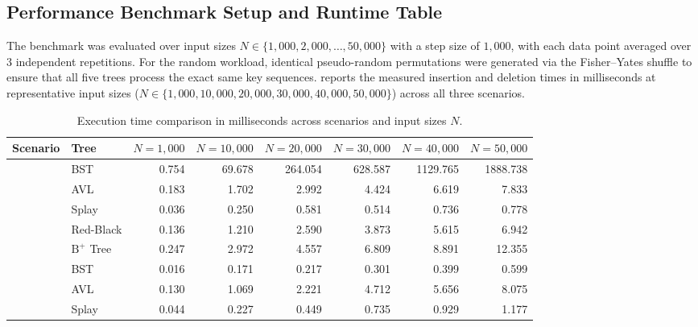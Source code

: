 \documentclass[10pt, a4paper]{article}
\begin{document}
\subsection{Performance Benchmark Setup and Runtime Table}
The benchmark was evaluated over input sizes $N \in \{1{,}000, 2{,}000, \dots, 50{,}000\}$ with a step size of $1{,}000$, with each data point averaged over $3$ independent repetitions. For the random workload, identical pseudo-random permutations were generated via the Fisher--Yates shuffle to ensure that all five trees process the exact same key sequences.  reports the measured insertion and deletion times in milliseconds at representative input sizes ($N \in \{1{,}000, 10{,}000, 20{,}000, 30{,}000, 40{,}000, 50{,}000\}$) across all three scenarios.
\vspace{-0.4em}
\begin{table}[H]
\centering
\caption{Execution time comparison in milliseconds across scenarios and input sizes $N$.}
\label{tab:runtime_table}
\renewcommand{\arraystretch}{0.95}
\setlength{\tabcolsep}{4.2pt}
\begin{tabular}{@{}llrrrrrr@{}}
\toprule
\textbf{\color{primary}Scenario} & \textbf{\color{primary}Tree} & \textbf{\color{primary}$N=1{,}000$} & \textbf{\color{primary}$N=10{,}000$} & \textbf{\color{primary}$N=20{,}000$} & \textbf{\color{primary}$N=30{,}000$} & \textbf{\color{primary}$N=40{,}000$} & \textbf{\color{primary}$N=50{,}000$} \\
\midrule
{}
  & BST       & 0.754 & 69.678 & 264.054 & 628.587 & 1129.765 & 1888.738 \\
  & AVL       & 0.183 &  1.702 &   2.992 &   4.424 &    6.619 &    7.833 \\
  & Splay     & 0.036 &  0.250 &   0.581 &   0.514 &    0.736 &    0.778 \\
  & Red-Black & 0.136 &  1.210 &   2.590 &   3.873 &    5.615 &    6.942 \\
  & $\text{B}^+$ Tree & 0.247 &  2.972 &   4.557 &   6.809 &    8.891 &   12.355 \\
\midrule
{}
  & BST       & 0.016 &  0.171 &   0.217 &   0.301 &    0.399 &    0.599 \\
  & AVL       & 0.130 &  1.069 &   2.221 &   4.712 &    5.656 &    8.075 \\
  & Splay     & 0.044 &  0.227 &   0.449 &   0.735 &    0.929 &    1.177 \\

\end{tabular}
\end{table}
\end{document}
